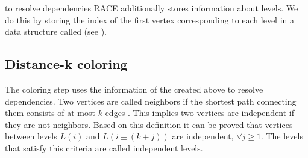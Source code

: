 \Inorder to resolve dependencies \acrshort{RACE} additionally stores information
about levels. We do this by storing the index of the first vertex corresponding
to each level in a data structure called \levelPtr (see ).

\subsection{Distance-k coloring}
The \DK coloring step uses the information of the \levelPtr created above to resolve
dependencies. Two vertices are called \DK neighbors if the shortest path connecting 
them consists of at most $k$ edges \cite{dist_k_def}. This implies two vertices
 are \DK independent if they are not \DK neighbors. Based on this definition
 it can be proved that vertices between levels $L(i)$ and $L(i \pm (k+j))$ are
 \DK independent, $\forall j\ge1$. The levels that satisfy this criteria
 are called \DK independent levels.
 
